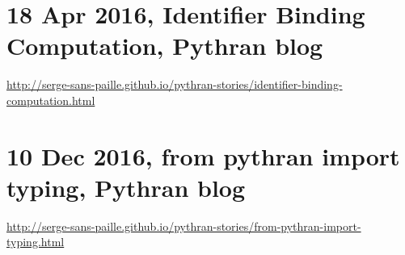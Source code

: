 \documentclass{deliverablereport}
\author{Serge Guelton}
\begin{document}
\maketitle
%
\strut\githubissuedescription
\newpage\tableofcontents\newpage

\clearpage
\appendix
\section{18 Apr 2016, Identifier Binding Computation, Pythran blog}

{\scriptsize \url{http://serge-sans-paille.github.io/pythran-stories/identifier-binding-computation.html}}

\bigskip



\clearpage

\section{10 Dec 2016, from pythran import typing, Pythran blog}

{\scriptsize \url{http://serge-sans-paille.github.io/pythran-stories/from-pythran-import-typing.html}}

\medskip



\clearpage


\printbibliography
\end{document}
